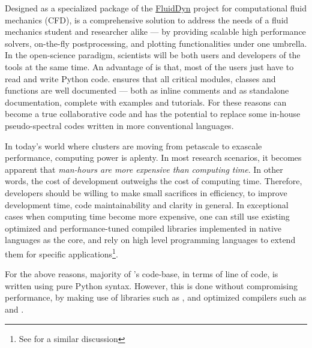 
Designed as a specialized package of the
\href{https://fluiddyn.readthedocs.io}{FluidDyn} project for computational fluid
mechanics (CFD),  is a comprehensive solution to address the needs
of a fluid mechanics student and researcher alike --- by providing scalable high
performance solvers, on-the-fly postprocessing, and plotting functionalities under
one umbrella.  In the open-science paradigm, scientists will be both users and
developers of the tools at the same time.
%
An advantage of  is that, most of the users just have to read and
write Python code.   ensures that all critical modules, classes and
functions are well documented --- both as inline comments and as standalone
documentation, complete with examples and tutorials.  For these reasons
 can become a true collaborative code and has the potential to
replace some in-house pseudo-spectral codes written in more conventional
languages.

In today's world where clusters are moving from petascale to exascale
performance, computing power is aplenty. In most research scenarios, it becomes
apparent that \emph{man-hours are more expensive than computing time}. In other
words, the cost of development outweighs the cost of computing time. Therefore,
developers should be willing to make small sacrifices in efficiency, to improve
development time, code maintainability and clarity in general. In exceptional
cases when computing time become more expensive, one can still use
existing optimized and performance-tuned compiled libraries implemented in
native languages as the core, and rely on high level programming languages to
extend them for specific applications\footnote{See
  \citet{ramachandran_pysph_2016} for a similar discussion}.

For the above reasons, majority of 's code-base, in terms of
line of code, is written using pure Python syntax. However, this is done
without compromising performance, by making use of libraries such as \Numpy,
and optimized compilers such as  and .

